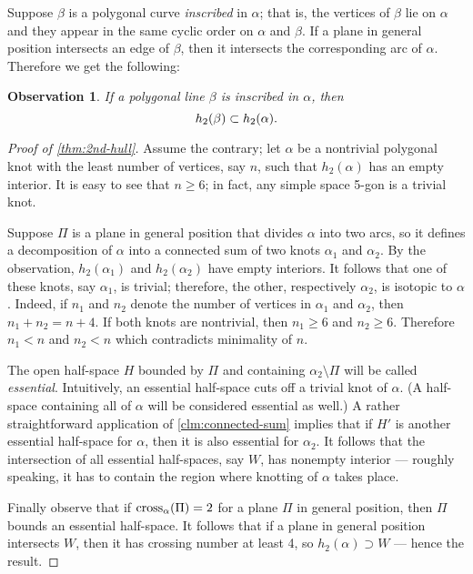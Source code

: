 \documentclass{article}
\newcommand*{\z}[1]{#1\nobreak\discretionary{}%
            {\hbox{$\mathsurround=0pt #1$}}{}}
\theoremstyle{theorem}
\newtheorem{Crofton-type formula}[theorem]{Crofton-type formula}
\newtheorem{Douglas--Rado theorem}[theorem]{Douglas--Rado theorem}
\newtheorem{Extended monotonicity theorem}[theorem]{Extended monotonicity theorem}
\newtheorem{Observation}[theorem]{Observation}
\theoremstyle{definition}
\def\cross{\mathop{\rm cross}\nolimits}
\begin{document}
Suppose $\beta$ is a polygonal curve \emph{inscribed} in $\alpha$;
that is, the vertices of $\beta$ lie on $\alpha$ and they appear in the same cyclic order on $\alpha$ and $\beta$.
If a plane in general position intersects an edge of $\beta$, then it intersects
the corresponding arc of $\alpha$. %
Therefore we get the following:

\begin{Observation}
If a polygonal line $\beta$ is inscribed in $\alpha$, then 
\[h_2(\beta)\z\subset h_2(\alpha).\]
\end{Observation}

\begin{proof}[Proof of \ref{thm:2nd-hull}]
Assume the contrary; let $\alpha$ be a nontrivial polygonal knot with the least number of vertices, say $n$, such that $h_2(\alpha)$ has an empty interior.
It is easy to see that $n\ge 6$;
in fact, any simple space 5-gon is a trivial knot.

Suppose $\Pi$ is a plane in general position that divides $\alpha$ into two arcs, so it defines a decomposition of $\alpha$ into a connected sum of two knots $\alpha_1$ and $\alpha_2$.
By the observation, $h_2(\alpha_1)$ and $h_2(\alpha_2)$ have empty interiors.
It follows that one of these knots, say $\alpha_1$, is trivial;
therefore, the other, respectively $\alpha_2$, is isotopic to $\alpha$.
Indeed, if $n_1$ and $n_2$ denote the number of vertices in $\alpha_1$ and $\alpha_2$, then $n_1+n_2=n+4$. 
If both knots are nontrivial, then $n_1\ge 6$ and $n_2\ge 6$.
Therefore $n_1<n$ and $n_2<n$ which contradicts minimality of $n$.

The open half-space $H$ bounded by $\Pi$ and containing $\alpha_2\setminus\Pi$ will be called \emph{essential}. Intuitively, an essential half-space cuts off
a trivial knot of $\alpha$. (A half-space containing all of $\alpha$ will be considered essential as well.)
A rather straightforward application of \ref{clm:connected-sum} implies that if $H'$ is another essential half-space for $\alpha$, then it is also essential for $\alpha_2$.
It follows that the intersection of all essential half-spaces, say $W$, has nonempty interior --- roughly speaking, it has to contain the region where knotting of $\alpha$ takes place.

Finally observe that if $\cross_\alpha(\Pi)=2$ for a plane $\Pi$ in general position, then $\Pi$ bounds an essential half-space. 
It follows that if a plane in general position intersects $W$, then it has  crossing number at least 4,
so $h_2(\alpha)\supset W$ --- hence the result.
\end{proof}
\end{document}
